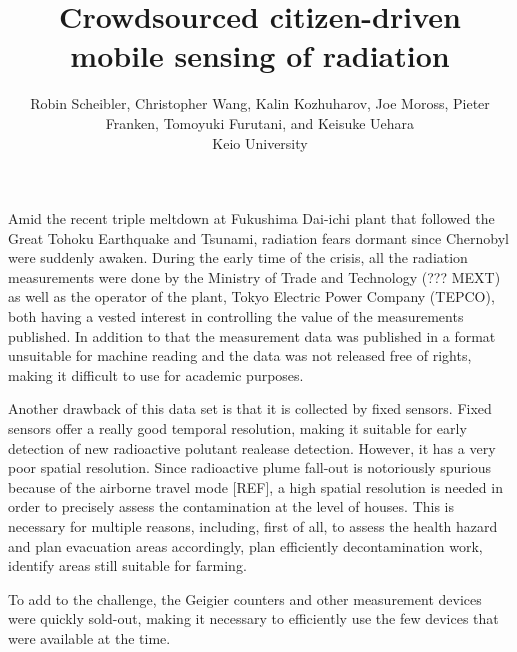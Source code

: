 \documentclass[11pt]{article}
\newcommand*{\TitleFont}{%
  \Large\usefont{T1}{phv}{b}{n}%
    \selectfont}
\newcommand*{\AuthorFont}{%
  \normalsize\usefont{T1}{\rmdefault}{m}{n}%
    \selectfont}
\begin{document}
%
\title{\TitleFont Crowdsourced citizen-driven mobile sensing of radiation}



\author{
  \AuthorFont
  Robin Scheibler, Christopher Wang, Kalin Kozhuharov, Joe Moross, Pieter Franken, Tomoyuki Furutani, and Keisuke Uehara \\
  Keio University
}

\maketitle

\label{sec:abstract}

Amid the recent triple meltdown at Fukushima Dai-ichi plant that followed the Great Tohoku Earthquake and Tsunami, radiation fears dormant since Chernobyl were suddenly awaken.
During the early time of the crisis, all the radiation measurements were done by the Ministry of Trade and Technology (??? MEXT) as well as the operator of the
plant, Tokyo Electric Power Company (TEPCO), both having a vested interest in controlling the value of the measurements published. In addition to that the measurement
data was published in a format unsuitable for machine reading and the data was not released free of rights, making it difficult to use for academic purposes.

Another drawback of this data set is that it is collected by fixed sensors. Fixed sensors offer a really good temporal resolution, making it suitable for
early detection of new radioactive polutant realease detection. However, it has a very poor spatial resolution. Since radioactive plume fall-out is notoriously
spurious because of the airborne travel mode [REF], a high spatial resolution is needed in order to precisely assess the contamination at the level of houses.
This is necessary for multiple reasons, including, first of all, to assess the health hazard and plan evacuation areas accordingly, plan efficiently decontamination
work, identify areas still suitable for farming.

To add to the challenge, the Geigier counters and other measurement devices were quickly sold-out, making it necessary to efficiently use the few devices that
were available at the time.
\end{document}
